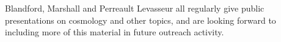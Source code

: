 \documentclass[psfig,12pt]{article}
\begin{document}
{Blandford, Marshall and Perreault Levasseur all regularly give public
presentations on cosmology and other topics, and are looking forward to
including more of this material in future outreach activity.




}
\end{document}
